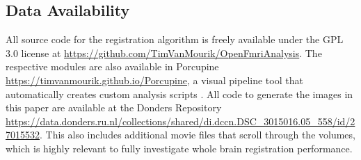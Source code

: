\subsection{Data Availability}
All source code for the registration algorithm is freely available under the GPL 3.0 license at \url{https://github.com/TimVanMourik/OpenFmriAnalysis}. The respective modules are also available in Porcupine \url{https://timvanmourik.github.io/Porcupine}, a visual pipeline tool that automatically creates custom analysis scripts \cite{VanMourik2017}. All code to generate the images in this paper are available at the Donders Repository \\ \url{https://data.donders.ru.nl/collections/shared/di.dccn.DSC_3015016.05_558/id/27015532}. This also includes additional movie files that scroll through the volumes, which is highly relevant to fully investigate whole brain registration performance. 



